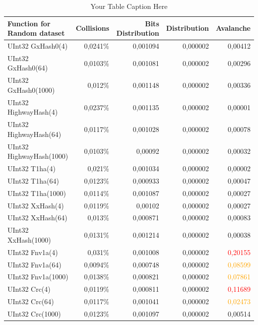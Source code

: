 \documentclass[10pt]{article}
\begin{document}
\begin{table}[H]
\centering
\begin{tabular}{|l|r|r|r|r|}
\hline
\textbf{Function for Random dataset} & \textbf{Collisions} & \textbf{Bits Distribution} & \textbf{Distribution} & \textbf{Avalanche} \\
\hline
UInt32 GxHash0(4)            & 0,0241\% & 0,001094  & 0,000002 & 0,00412 \\
UInt32 GxHash0(64)           & 0,0103\% & 0,001081  & 0,000002 & 0,00296 \\
UInt32 GxHash0(1000)         & 0,012\%  & 0,001148  & 0,000002 & 0,00336 \\
UInt32 HighwayHash(4)        & 0,0237\% & 0,001135  & 0,000002 & 0,00001 \\
UInt32 HighwayHash(64)       & 0,0117\% & 0,001028  & 0,000002 & 0,00078 \\
UInt32 HighwayHash(1000)     & 0,0103\% & 0,00092   & 0,000002 & 0,00032 \\
UInt32 T1ha(4)               & 0,021\%  & 0,001034  & 0,000002 & 0,00002 \\
UInt32 T1ha(64)              & 0,0123\% & 0,000933  & 0,000002 & 0,00047 \\
UInt32 T1ha(1000)            & 0,0114\% & 0,001087  & 0,000002 & 0,00027 \\
UInt32 XxHash(4)            & 0,0119\% & 0,00102   & 0,000002 & 0,00027 \\
UInt32 XxHash(64)           & 0,013\%  & 0,000871  & 0,000002 & 0,00083 \\
UInt32 XxHash(1000)         & 0,0131\% & 0,001214  & 0,000002 & 0,00038 \\
UInt32 Fnv1a(4)             & 0,031\%  & 0,001008  & 0,000002 & \textcolor{red}{0,20155} \\
UInt32 Fnv1a(64)            & 0,0094\% & 0,000748  & 0,000002 & \textcolor{orange}{0,08599} \\
UInt32 Fnv1a(1000)          & 0,0138\% & 0,000821  & 0,000002 & \textcolor{orange}{0,07861} \\
UInt32 Crc(4)               & 0,0119\% & 0,000811  & 0,000002 & \textcolor{red}{0,11689} \\
UInt32 Crc(64)              & 0,0117\% & 0,001041  & 0,000002 & \textcolor{orange}{0,02473} \\
UInt32 Crc(1000)            & 0,0123\% & 0,001097  & 0,000002 & 0,00514 \\
\hline
\end{tabular}
\caption{Your Table Caption Here}
\label{tab:quality-data-random}
\end{table}
    
\end{document}
